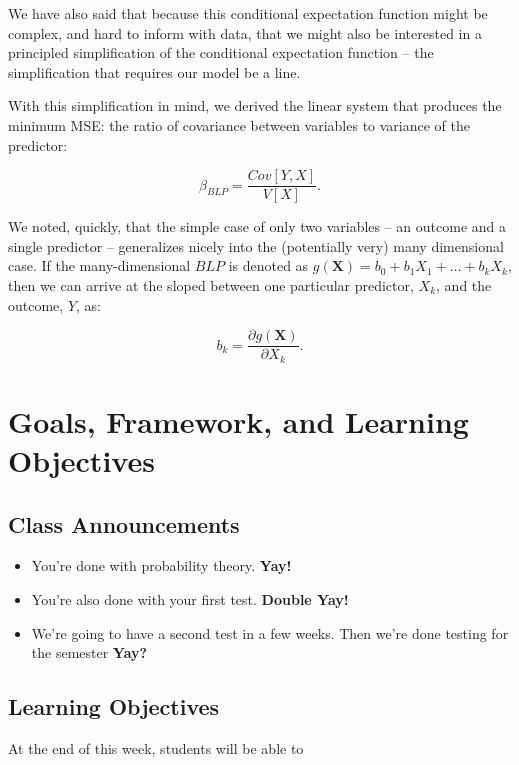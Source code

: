 \documentclass[
  letterpaper,
  DIV=11,
  numbers=noendperiod]{scrreprt}
\providecommand{\tightlist}{%
  \setlength{\itemsep}{0pt}\setlength{\parskip}{0pt}}\usepackage{longtable,booktabs,array}
\begin{document}
We have also said that because this conditional expectation function
might be complex, and hard to inform with data, that we might also be
interested in a principled simplification of the conditional expectation
function -- the simplification that requires our model be a line.

With this simplification in mind, we derived the linear system that
produces the minimum MSE: the ratio of covariance between variables to
variance of the predictor:

\[
  \beta_{BLP} = \frac{Cov[Y,X]}{V[X]}. 
\]

We noted, quickly, that the simple case of only two variables -- an
outcome and a single predictor -- generalizes nicely into the
(potentially very) many dimensional case. If the many-dimensional
\(BLP\) is denoted as
\(g(\mathbf{X}) = b_{0} + b_{1}X_{1} + \dots + b_{k}X_{k}\), then we can
arrive at the sloped between one particular predictor, \(X_{k}\), and
the outcome, \(Y\), as:

\[
  b_{k} = \frac{\partial g(\mathbf{X})}{\partial X_{k}}. 
\]

\section{Goals, Framework, and Learning
Objectives}\label{goals-framework-and-learning-objectives}

\subsection{Class Announcements}\label{class-announcements-3}

\begin{itemize}
\tightlist
\item
  You're done with probability theory. \textbf{Yay!}
\item
  You're also done with your first test. \textbf{Double Yay!}
\item
  We're going to have a second test in a few weeks. Then we're done
  testing for the semester \textbf{Yay?}
\end{itemize}

\subsection{Learning Objectives}\label{learning-objectives-4}

At the end of this week, students will be able to
\end{document}
